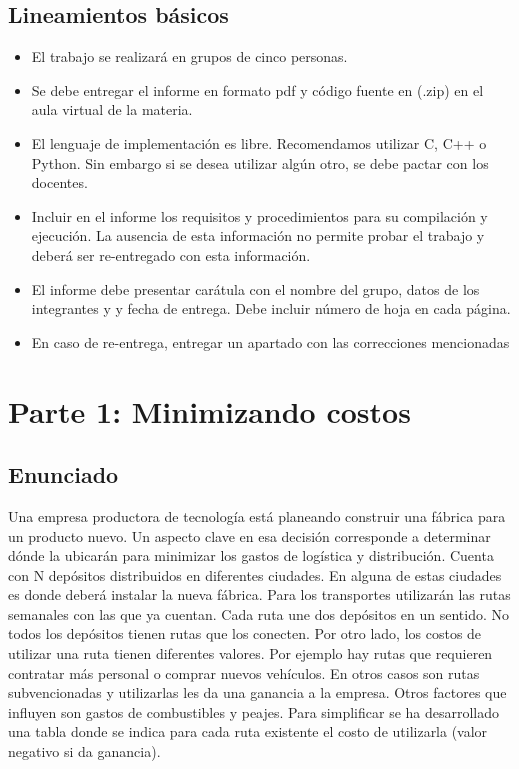 \documentclass[titlepage,a4paper]{article}
\begin{document}
\subsection{Lineamientos básicos}
\begin{itemize}
    \item El trabajo se realizará en grupos de cinco personas.
    \item Se debe entregar el informe en formato pdf y código fuente en (.zip) en el aula virtual de la materia.
    \item El lenguaje de implementación es libre. Recomendamos utilizar C, C++ o Python. Sin embargo si se desea utilizar algún otro, se debe pactar con los docentes.
    \item Incluir en el informe los requisitos y procedimientos para su compilación y ejecución. La ausencia de esta información no permite probar el trabajo y deberá ser re-entregado con esta información.
    \item El informe debe presentar carátula con el nombre del grupo, datos de los integrantes y y fecha de entrega. Debe incluir número de hoja en cada página.
    \item En caso de re-entrega, entregar un apartado con las correcciones mencionadas
\end{itemize}

\newpage\section{Parte 1: Minimizando costos}\label{sec:parte1}

\subsection{Enunciado}

Una empresa productora de tecnología está planeando construir una fábrica para un
producto nuevo. Un aspecto clave en esa decisión corresponde a determinar dónde la
ubicarán para minimizar los gastos de logística y distribución. Cuenta con N depósitos
distribuidos en diferentes ciudades. En alguna de estas ciudades es donde deberá
instalar la nueva fábrica. Para los transportes utilizarán las rutas semanales con las
que ya cuentan. Cada ruta une dos depósitos en un sentido. No todos los depósitos
tienen rutas que los conecten. Por otro lado, los costos de utilizar una ruta tienen
diferentes valores. Por ejemplo hay rutas que requieren contratar más personal o
comprar nuevos vehículos. En otros casos son rutas subvencionadas y utilizarlas les
da una ganancia a la empresa. Otros factores que influyen son gastos de combustibles
y peajes. Para simplificar se ha desarrollado una tabla donde se indica para cada
ruta existente el costo de utilizarla (valor negativo si da ganancia).
\end{document}
